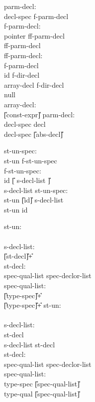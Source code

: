 \begin{center}
\PAIR
{
parm-decl: \\
\>	decl-spec f-parm-decl \\
f-parm-decl:\\
\>	pointer ff-parm-decl \\
\>      ff-parm-decl \\
ff-parm-decl:\\
\>      \T{(} f-parm-decl \T{)} \\
\>	id  f-dir-decl\\
\>      array-decl f-dir-decl \\
\>      null \\
array-decl: \\
\>	\T{[} \U{[}const-expr\U{]} \T{]} 
}
{
parm-decl: \\
\>	decl-spec decl \\
\>	decl-spec \U{[}abs-decl\U{]} 
}


\PAIR 
{
st-un-spec: \\
\>	st-un f-st-un-spec \\
f-st-un-spec: \\
\>	id \U{[}\T{\{} s-decl-list \T{\}}\U{]}  \\
\>	\T{\{} s-decl-list \T{\}} 
}
{
st-un-spec: \\
\> 	st-un \U{[}id\U{]} \T{\{} s-decl-list \T{\}}\\
\>	st-un id
}

\PAIR
{
st-un: \\
\>	   \\
s-decl-list: \\
\>	\U{[}st-decl\U{]}\U{+} \\
st-decl: \\
\>	spec-qual-list spec-declor-list \T{;} \\
spec-qual-list: \\
\>	\U{[}type-spec\U{]}\U{+}\\
\>      \U{[}type-spec\U{]}\U{+}
}
{
st-un: \\
\>	  \\
s-decl-list: \\
\>	st-decl \\
\>	s-decl-list st-decl \\
st-decl: \\
\>	spec-qual-list spec-declor-list \T{;} \\
spec-qual-list: \\
\>	type-spec \U{[}spec-qual-list\U{]}\\ 
\>      type-qual \U{[}spec-qual-list\U{]}
}


\end{center}
